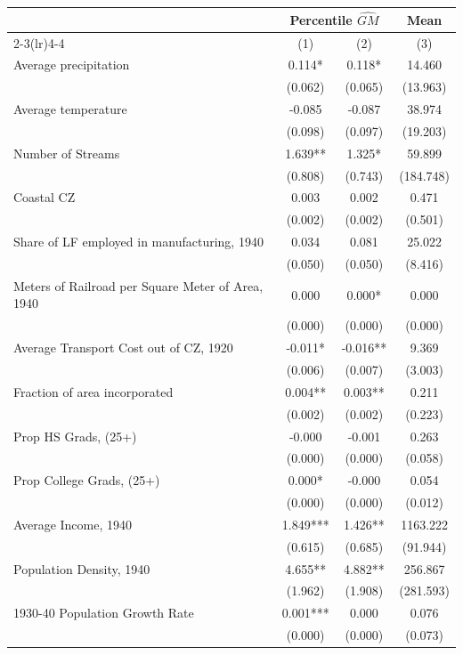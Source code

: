 \begin{tabular}{l*{3}{c}} \toprule
&\multicolumn{2}{c}{Percentile  $\widehat{GM}$}&\multicolumn{1}{c}{Mean}\\\cmidrule(lr){2-3}\cmidrule(lr){4-4}
&\multicolumn{1}{c}{(1)}&\multicolumn{1}{c}{(2)}&\multicolumn{1}{c}{(3)}\\
\midrule 
Average precipitation  &    0.114* & 0.118* & 14.460 \\
                &  (0.062)  &  (0.065)  &  (13.963)    \\
Average temperature  &    -0.085 & -0.087 & 38.974 \\
                &  (0.098)  &  (0.097)  &  (19.203)    \\
Number of Streams  &    1.639** & 1.325* & 59.899 \\
                &  (0.808)  &  (0.743)  &  (184.748)    \\
Coastal CZ  &    0.003 & 0.002 & 0.471 \\
                &  (0.002)  &  (0.002)  &  (0.501)    \\
Share of LF employed in manufacturing, 1940  &    0.034 & 0.081 & 25.022 \\
                &  (0.050)  &  (0.050)  &  (8.416)    \\
Meters of Railroad per Square Meter of Area, 1940  &    0.000 & 0.000* & 0.000 \\
                &  (0.000)  &  (0.000)  &  (0.000)    \\
Average Transport Cost out of CZ, 1920  &    -0.011* & -0.016** & 9.369 \\
                &  (0.006)  &  (0.007)  &  (3.003)    \\
Fraction of area incorporated  &    0.004** & 0.003** & 0.211 \\
                &  (0.002)  &  (0.002)  &  (0.223)    \\
Prop HS Grads, (25+)  &    -0.000 & -0.001 & 0.263 \\
                &  (0.000)  &  (0.000)  &  (0.058)    \\
Prop College Grads, (25+)  &    0.000* & -0.000 & 0.054 \\
                &  (0.000)  &  (0.000)  &  (0.012)    \\
Average Income, 1940  &    1.849*** & 1.426** & 1163.222 \\
                &  (0.615)  &  (0.685)  &  (91.944)    \\
Population Density, 1940  &    4.655** & 4.882** & 256.867 \\
                &  (1.962)  &  (1.908)  &  (281.593)    \\
1930-40 Population Growth Rate  &    0.001*** & 0.000 & 0.076 \\
                &  (0.000)  &  (0.000)  &  (0.073)    \\
\bottomrule \end{tabular}
